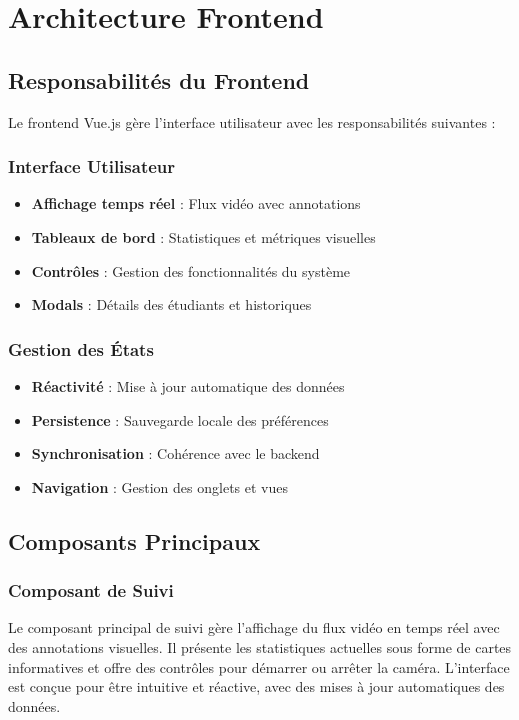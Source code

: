 \documentclass[12pt,a4paper]{article}
\begin{document}
\section{Architecture Frontend}

\subsection{Responsabilités du Frontend}

Le frontend Vue.js gère l'interface utilisateur avec les responsabilités suivantes :

\subsubsection{Interface Utilisateur}
\begin{itemize}
    \item \textbf{Affichage temps réel} : Flux vidéo avec annotations
    \item \textbf{Tableaux de bord} : Statistiques et métriques visuelles
    \item \textbf{Contrôles} : Gestion des fonctionnalités du système
    \item \textbf{Modals} : Détails des étudiants et historiques
\end{itemize}

\subsubsection{Gestion des États}
\begin{itemize}
    \item \textbf{Réactivité} : Mise à jour automatique des données
    \item \textbf{Persistence} : Sauvegarde locale des préférences
    \item \textbf{Synchronisation} : Cohérence avec le backend
    \item \textbf{Navigation} : Gestion des onglets et vues
\end{itemize}

\subsection{Composants Principaux}

\subsubsection{Composant de Suivi}
Le composant principal de suivi gère l'affichage du flux vidéo en temps réel avec des annotations visuelles. Il présente les statistiques actuelles sous forme de cartes informatives et offre des contrôles pour démarrer ou arrêter la caméra. L'interface est conçue pour être intuitive et réactive, avec des mises à jour automatiques des données.
\end{document}
